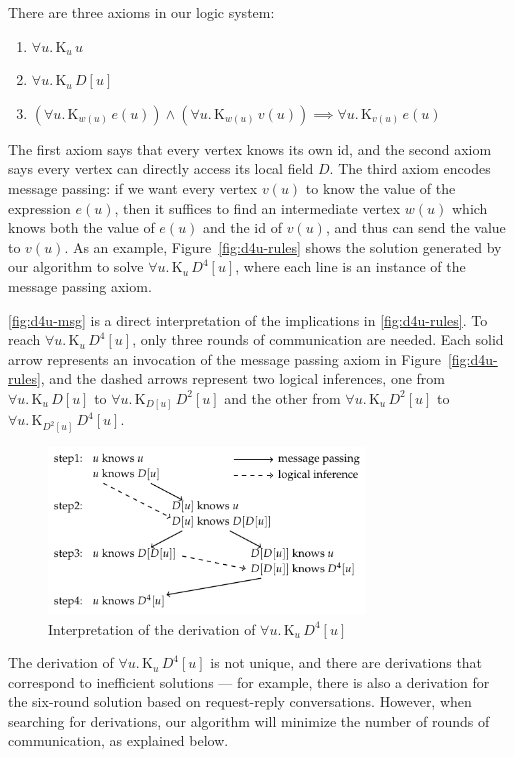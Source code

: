 \documentclass{sokendai_thesis} %
\newcommand{\knows}[2]{\mathrm K_{#1}\,{#2}}
\begin{document}
There are three axioms in our logic system:
\begin{enumerate}
\item $\forall u.\,\knows{u}{u}$
\item $\forall u.\,\knows{u}{\mathit{D}[u]}$
\item $(\forall u.\,\knows{w(u)}{e(u)}) \wedge (\forall u.\,\knows{w(u)}{v(u)}) \implies \forall u.\,\knows{v(u)}{e(u)}$
\end{enumerate}
The first axiom says that every vertex knows its own id, and the second axiom says every vertex can directly access its local field $D$.
The third axiom encodes message passing: if we want every vertex $v(u)$ to know the value of the expression $e(u)$, then it suffices to find an intermediate vertex $w(u)$ which knows both the value of $e(u)$ and the id of $v(u)$, and thus can send the value to $v(u)$.
As an example, Figure~\ref{fig:d4u-rules} shows the solution generated by our algorithm to solve $\forall u.\,\knows{u}{D^4[u]}$, where each line is an instance of the message passing axiom.

\autoref{fig:d4u-msg} is a direct interpretation of the implications in \autoref{fig:d4u-rules}.
To reach $\forall u.\,\knows{u}{D^4[u]}$, only three rounds of communication are needed.
Each solid arrow represents an invocation of the message passing axiom in Figure~\ref{fig:d4u-rules}, and the dashed arrows represent two logical inferences, one from $\forall u.\,\knows{u}{D[u]}$ to $\forall u.\,\knows{D[u]}{D^2[u]}$ and the other from $\forall u.\,\knows{u}{D^2[u]}$ to $\forall u.\,\knows{D^2[u]}{D^4[u]}$.

\begin{figure}[t]
 \centering
 \includegraphics[width=0.75\textwidth]{figures/d4u.pdf}
 \caption{Interpretation of the derivation of $\forall u.\,\knows{u}{D^4[u]}$}
 \label{fig:d4u-msg}
\vspace{-2ex}\end{figure}

The derivation of $\forall u.\,\knows{u}{D^4[u]}$ is not unique, and there are derivations that correspond to inefficient solutions --- for example, there is also a derivation for the six-round solution based on request-reply conversations.
However, when searching for derivations, our algorithm will minimize the number of rounds of communication, as explained below.
\end{document}
